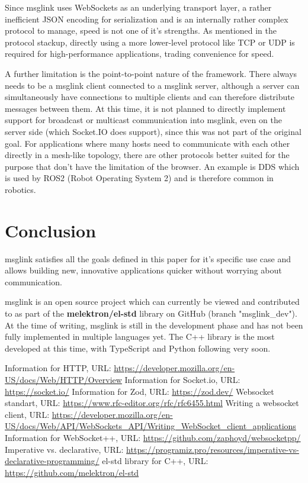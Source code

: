 \documentclass[conference]{IEEEtran}
\begin{document}
Since msglink uses WebSockets as an underlying transport layer, a rather inefficient JSON encoding for serialization and is an internally rather complex protocol to manage, speed is not one of it's strengths. As mentioned in the protocol stackup, directly using a more lower-level protocol like TCP or UDP is required for high-performance applications, trading convenience for speed.

A further limitation is the point-to-point nature of the framework. There always needs to be a msglink client connected to a msglink server, although a server can simultaneously have connections to multiple clients and can therefore distribute messages between them. At this time, it is not planned to directly implement support for broadcast or multicast communication into msglink, even on the server side (which Socket.IO does support), since this was not part of the original goal. For applications where many hosts need to communicate with each other directly in a mesh-like topology, there are other protocols better suited for the purpose that don't have the limitation of the browser. An example is DDS which is used by ROS2 (Robot Operating System 2) and is therefore common in robotics.


\section{Conclusion}

msglink satisfies all the goals defined in this paper for it's specific use case and allows building new, innovative applications quicker without worrying about communication.

msglink is an open source project which can currently be viewed and contributed to as part of the \textbf{melektron/el-std} library on GitHub (branch "msglink\_dev"). At the time of writing, msglink is still in the development phase and has not been fully implemented in multiple languages yet. The C++ library is the most developed at this time, with TypeScript and Python following very soon. \cite{el-std-gh}


\begin{thebibliography}{00}

     Information for HTTP, URL: \url{https://developer.mozilla.org/en-US/docs/Web/HTTP/Overview}
     Information for Socket.io, URL: \url{https://socket.io/}
     Information for Zod, URL: \url{https://zod.dev/}
     Websocket standart, URL: \url{https://www.rfc-editor.org/rfc/rfc6455.html}
     Writing a websocket client, URL: \url{https://developer.mozilla.org/en-US/docs/Web/API/WebSockets_API/Writing_WebSocket_client_applications}
     Information for WebSocket++, URL: \url{https://github.com/zaphoyd/websocketpp/}
     Imperative vs. declarative, URL: \url{https://programiz.pro/resources/imperative-vs-declarative-programming/}
     el-std library for C++, URL: \url{https://github.com/melektron/el-std}
    
    
\end{thebibliography}
\end{document}
